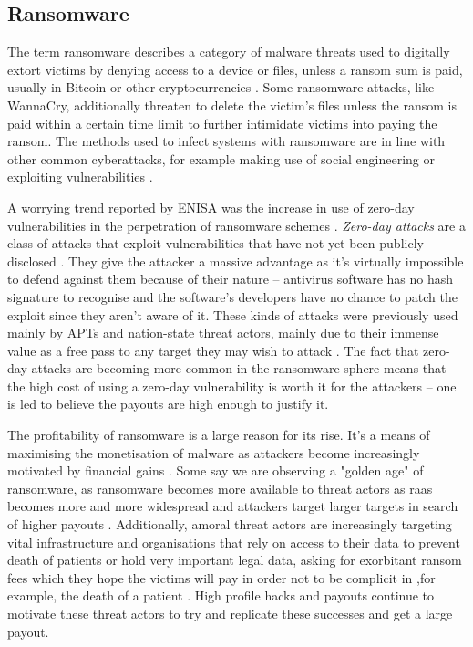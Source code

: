 \subsection{Ransomware}
The term ransomware describes a category of malware threats used to digitally extort victims 
by denying access to a device or files, unless a ransom sum is paid, usually in Bitcoin or other 
cryptocurrencies \cite[p.~150]{ransomware-book}. Some ransomware attacks, like WannaCry, additionally 
threaten to delete the victim's files unless the ransom is paid within a certain time limit to further
intimidate victims into paying the ransom. The methods used to infect systems with ransomware are in line
with other common cyberattacks, for example making use of social engineering or exploiting vulnerabilities
\cite{nist_ransomware}.

A worrying trend reported by \acrshort{ENISA} was the increase in use of zero-day vulnerabilities in the
perpetration of ransomware schemes \cite{enisa_threat_landscape}. \emph{Zero-day attacks} are a class of
attacks that exploit vulnerabilities that have not yet been publicly disclosed \cite{zero-day}. They give the 
attacker a massive advantage as it's virtually impossible to defend against them because of their nature -- 
antivirus software has no hash signature to recognise and the software's developers have no chance to patch the
exploit since they aren't aware of it. These kinds of attacks were previously used mainly by \acrfull{APT}s 
and nation-state threat actors, mainly due to their immense value as a free pass to
any target they may wish to attack \cite{enisa_threat_landscape}. The fact that zero-day attacks are becoming more
common in the ransomware sphere means that the high cost of using a zero-day vulnerability is worth it for the 
attackers -- one is led to believe the payouts are high enough to justify it. 

The profitability of ransomware is a large reason for its rise. It's a means of maximising the monetisation of 
malware as attackers become increasingly motivated by financial gains \cite{ransomware-comprehensive, enisa_threat_landscape}.
Some say we are observing a "golden age" of ransomware, as ransomware becomes more available to threat actors
as \acrfull{raas} becomes more and more widespread and attackers target larger targets in search
of higher payouts \cite{enisa_threat_landscape}. Additionally, amoral threat actors are increasingly targeting
vital infrastructure and organisations that rely on access to their data to prevent death of patients
or hold very important legal data, asking for exorbitant ransom fees which they hope the victims will pay in order
not to be complicit in ,for example, the death of a patient \cite[p.~17-18]{morphisec_threat_landscape,
ransomware-book}. 
High profile hacks and payouts continue to motivate these threat actors to try and replicate these successes and 
get a large payout. 

